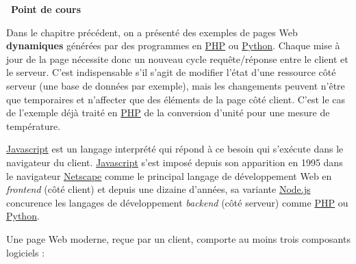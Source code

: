 \documentclass[
  11pt,
]{article}
\newcounter{cours}
\newenvironment{cours}[1]
{\par \medskip   \addtocounter{cours}{1} \noindent  
\begin{bclogo}[arrondi =0.1,  ombre = true, barre=none, logo=\bcbook, marge=4]{~\textbf{Point de cours} \textbf{\thecours} {\itshape #1} }  \par}
{
\end{bclogo}
 \par \bigskip }
\newcounter{prog}
\newcounter{logi}
\begin{document}
\begin{cours}{}

Dans le chapitre précédent, on a présenté des exemples de pages Web
\textbf{dynamiques} générées par des programmes en
\href{https://developer.mozilla.org/fr/docs/Glossaire/PHP}{PHP} ou
\href{https://docs.python.org/3.7/library/cgi.html}{Python}. Chaque mise
à jour de la page nécessite donc un nouveau cycle requête/réponse entre
le client et le serveur. C'est indispensable s'il s'agit de modifier
l'état d'une ressource côté serveur (une base de données par exemple),
mais les changements peuvent n'être que temporaires et n'affecter que
des éléments de la page côté client. C'est le cas de l'exemple déjà
traité en
\href{https://developer.mozilla.org/fr/docs/Glossaire/PHP}{PHP} de la
conversion d'unité pour une mesure de température.

\href{https://developer.mozilla.org/fr/docs/Glossaire/JavaScript}{Javascript}
est un langage interprété qui répond à ce besoin qui s'exécute dans le
navigateur du client.
\href{https://developer.mozilla.org/fr/docs/Glossaire/JavaScript}{Javascript}
s'est imposé depuis son apparition en 1995 dans le navigateur
\href{https://fr.wikipedia.org/wiki/Netscape_Navigator}{Netscape} comme
le principal langage de développement Web en \emph{frontend} (côté
client) et depuis une dizaine d'années, sa variante
\href{https://developer.mozilla.org/fr/docs/Glossaire/Node.js}{Node.js}
concurence les langages de développement \emph{backend} (côté serveur)
comme \href{https://developer.mozilla.org/fr/docs/Glossaire/PHP}{PHP} ou
\href{https://docs.python.org/3.7/library/cgi.html}{Python}.

Une page Web moderne, reçue par un client, comporte au moins trois
composants logiciels :


\end{cours}
\end{document}
